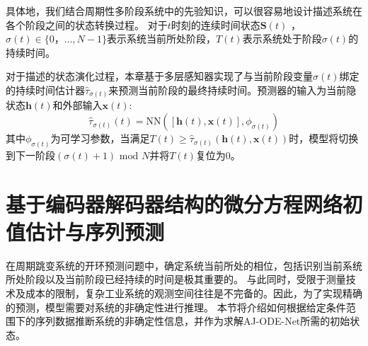 具体地，我们结合周期性多阶段系统中的先验知识，可以很容易地设计描述系统在各个阶段之间的状态转换过程。
对于$t$时刻的连续时间状态$\boldsymbol{S}(t)$ ， 
$\sigma(t)\in\{0，\dots,N-1\}$表示系统当前所处阶段，$T(t)$表示系统处于阶段$\sigma(t)$的持续时间。

对于描述的状态演化过程，本章基于多层感知器实现了与当前阶段变量${\sigma(t)}$绑定的持续时间估计器$\hat{\tau}_{{\sigma(t)}}$来预测当前阶段的最终持续时间。预测器的输入为当前隐状态$\boldsymbol{h}(t)$和外部输入$\boldsymbol{x}(t)$:
\begin{equation}
\hat{\tau}_{\sigma(t)}(t)=\text{NN}\left([\boldsymbol{h}(t), \boldsymbol{x}(t)], \phi_{\sigma(t)}\right)
\end{equation}
其中$\phi_{\sigma(t)}$为可学习参数，当满足$T(t)\geq\hat{\tau}_{\sigma(t)}(\boldsymbol{h}(t),\boldsymbol{x}(t))$时，模型将切换到下一阶段$(\sigma(t)+1)\text{ mod } N$并将$T(t)$复位为0。
\section{基于编码器解码器结构的微分方程网络初值估计与序列预测}
\label{sec:4_encoder_decoder}
在周期跳变系统的开环预测问题中，确定系统当前所处的相位，包括识别当前系统所处阶段以及当前阶段已经持续的时间是极其重要的。
与此同时，受限于测量技术及成本的限制，复杂工业系统的观测空间往往是不完备的。因此，为了实现精确的预测，模型需要对系统的非确定性进行推理。
本节将介绍如何根据给定条件范围下的序列数据推断系统的非确定性信息，并作为求解AJ-ODE-Net所需的初始状态。

